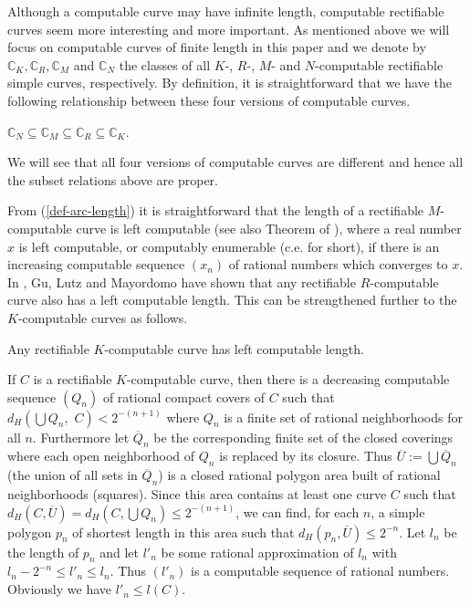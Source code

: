 \documentclass{LMCS}
\theoremstyle{plain}
\def\IC{\mathbb{C}}
\begin{document}
Although a computable curve may have infinite length, computable rectifiable curves seem more interesting and more important. As mentioned above we will focus on computable curves of finite length in this paper and we denote by $\IC_K,\IC_R, \IC_M$ and $ \IC_N$ the classes of all $K$-, $R$-, $M$- and $N$-computable rectifiable simple curves, respectively. By definition, it is straightforward that we have the following relationship between these four versions of computable curves.

\begin{thm}\label{Thm-comp-curve-subset}
$\IC_N \subseteq \IC_M \subseteq \IC_R \subseteq \IC_K$.
\end{thm}
We will see that all four versions of  computable curves are different and hence all the subset relations above are proper.

From (\ref{def-arc-length}) it is straightforward that the length of a rectifiable $M$-computable curve is left computable (see also Theorem of \cite{MZ2008}), where a real number $x$ is left computable, or computably enumerable (c.e. for short), if there is an increasing computable sequence $(x_n)$ of rational numbers which converges to $x$. In \cite{GLM11}, Gu, Lutz and Mayordomo have shown that any rectifiable $R$-computable curve also has a left computable length. This can be strengthened further to the $K$-computable curves as follows.

\begin{thm}\label{thm-lc-length-K}
Any rectifiable $K$-computable curve has left computable length.
\end{thm}
\proof If $C$ is a rectifiable $K$-computable curve, then there is a decreasing computable sequence $(Q_n)$ of rational compact covers of $C$ such that $d_H\left(\bigcup Q_n,\,\,C\right)<2^{-(n+1)}$ where $Q_n$ is a finite set of rational neighborhoods for all $n$. Furthermore let $\overline{Q}_n$ be the corresponding finite set of the closed coverings where each open neighborhood of $Q_n$ is replaced by its closure. Thus $\overline{U}:= \bigcup \overline{Q}_n$ (the union of all sets in $\overline{Q}_n$) is a closed rational polygon area built of rational neighborhoods (squares). Since this area contains at least one curve $C$ such that $d_H(C, \overline{U}) = d_H(C, \bigcup Q_n) \le 2^{-(n+1)}$, we can find, for each $n$, a simple polygon $p_n$ of shortest length in this area such that $d_H(p_n, \overline{U}) \le 2^{-n}$.
Let $l_n$ be the length of $p_n$ and let $l'_n$ be some rational approximation of $l_n$ with $l_n-2^{-n}\leq l'_n\leq l_n$. Thus $(l'_n)$ is a computable sequence of rational numbers. Obviously we have $l'_n \le l(C)$.
\end{document}
